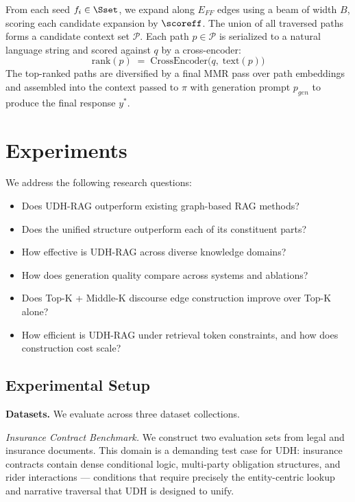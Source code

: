 \documentclass[runningheads]{llncs}
\begin{document}
From each seed $f_i \in \Sset$, we expand along $E_{FF}$ edges using a beam of
width $B$, scoring each candidate expansion by $\scoreff$. The union of all
traversed paths forms a candidate context set $\mathcal{P}$. Each path
$p \in \mathcal{P}$ is serialized to a natural language string and scored
against $q$ by a cross-encoder:
\[
  \mathrm{rank}(p) \;=\; \mathrm{CrossEncoder}\!\bigl(q,\; \mathrm{text}(p)\bigr)
\]
The top-ranked paths are diversified by a final MMR pass over path embeddings
and assembled into the context passed to $\pi$ with generation prompt $p_{gen}$
to produce the final response $y^*$.








\section{Experiments}

We address the following research questions:

\begin{itemize}
    \item[\textbf{RQ1}] Does UDH-RAG outperform existing graph-based RAG methods?
    \item[\textbf{RQ2}] Does the unified structure outperform each of its constituent parts?
    \item[\textbf{RQ3}] How effective is UDH-RAG across diverse knowledge domains?
    \item[\textbf{RQ4}] How does generation quality compare across systems and ablations?
    \item[\textbf{RQ5}] Does Top-K + Middle-K discourse edge construction improve over Top-K alone?
    \item[\textbf{RQ6}] How efficient is UDH-RAG under retrieval token constraints, and how does construction cost scale?
\end{itemize}

\subsection{Experimental Setup}

\textbf{Datasets.} We evaluate across three dataset collections.

\textit{Insurance Contract Benchmark.} We construct two evaluation sets from legal and insurance documents. This domain is a demanding test case for UDH: insurance contracts contain dense conditional logic, multi-party obligation structures, and rider interactions --- conditions that require precisely the entity-centric lookup and narrative traversal that UDH is designed to unify.
\end{document}
